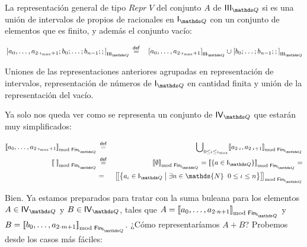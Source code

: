 \documentclass[final,12pt,a4paper,twoside,fleqn]{extbook}
\newcommand{\mathdef}{\ensuremath{\stackrel{\mathsf{def}}{{}={}}}}
\newcommand{\set}[1]{\ensuremath{\left\lbrace{#1}\right\rbrace}}
\newcommand {\setCompr}[2]{
	\ensuremath{
		\left\lbrace{ 
			#1 {\;\big{\vert}\;} #2
        }\right\rbrace
    }
}
\newcommand{\setN}{\ensuremath{\mathds{N}}}
\theoremstyle{definition}
\theoremstyle{remark}
\begin{document}
	La representación general de tipo \(Repr\;V\) del conjunto \(A\) de
\(\IIIQ\) si es una unión de intervalos de propios de racionales en \({\IQ}\)
con un conjunto de elementos que es finito, y además el conjunto vacío:



\begin{align}
\nonumber
{}&\left[{a_0,\ldots,a_{2\cdot{{\iota}_{\max}}+1}};b_0;\ldots;b_{n-1};;
\right]_{\IIIQ} \mathdef&
\left[{a_0,\ldots,a_{2\cdot{{\iota}_{\max}}+1}}\right]_{\IIIQ} \cup
{\left[b_0;\ldots;b_{n-1};;\right]}_{\IIIQ}
\end{align}



	Uniones de las representaciones anteriores agrupadas en 
representación de intervalos, representación de números de \(\IQ\) en
cantidad finita y unión de la representación del vacío.



	Ya solo nos queda ver como se representa un conjunto de \(\IVQ\) que
estarán muy simplificados:



\newcommand {\ClEqFinDiffInter}[1]{
	\ensuremath{ 
		{
		\left[\!\left[ 
			{#1} 
		\right]\!\right]
		}_{
		\FinDiffRel
		} 
	}
}



\begin{align}
\ClEqFinDiffInter{a_0,\ldots,a_{2\cdot{{\iota}_{\max}}+1}} &\mathdef&
{\bigcup}_{0\leq \iota \leq {\iota}_{\max}}\ClEqFinDiff{ { a_{2\cdot\iota} ,
a_{2\cdot\iota+1} } }\\
\ClEqFinDiffInter{\;} &\mathdef& \ClEqFinDiff{\emptyset} =
\ClEqFinDiff{\set{a\in\IQ}} =\\
&=&\ClEqFinDiff{\setCompr{a_\iota \in \IQ}{\exists n\in \setN\big{.}\;\;0\leq
\iota \leq n}}
\end{align}



	Bien. Ya estamos preparados para tratar con la suma buleana para los
elementos \(A\in\IVQ\) y \(B\in\IVQ\), tales que \(A =
\ClEqFinDiffInter{a_0,\ldots,a_{2\cdot n+1}}\) y  \(B =
\ClEqFinDiffInter{b_0,\ldots,a_{2\cdot m+1}}\). ¿Cómo representaríamos
\(A+B\)? Probemos desde los casos más fáciles:
\end{document}
